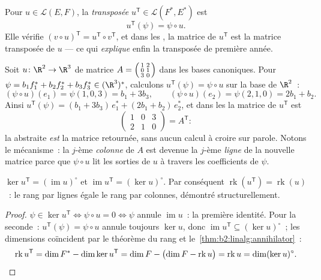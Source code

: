 \begin{definition}\label{def:b2:linalg:transpose}
Pour $u \in \mathcal{L}(E, F)$, la \emph{transposée} $u^{\mathsf T} \in \mathcal{L}(F^*, E^*)$ est
\[
u^{\mathsf T}(\psi) = \psi \circ u .
\]
Elle vérifie $(v \circ u)^{\mathsf T} = u^{\mathsf T} \circ v^{\mathsf
T}$, et dans les , la matrice de $u^{\mathsf T}$ est la
matrice transposée de $u$ --- ce qui \emph{explique} enfin la
transposée de première année.
\end{definition}

\begin{example}\label{ex:b2:linalg:transposework}
Soit $u \colon \R^2 \to \R^3$ de matrice $A =
\begin{psmallmatrix} 1 & 2\\ 0 & 1\\ 3 & 0\end{psmallmatrix}$ dans
les bases canoniques. Pour $\psi = b_1f_1^* + b_2f_2^* + b_3f_3^*
\in (\R^3)^*$, calculons $u^{\mathsf T}(\psi) = \psi \circ u$ sur
la base de $\R^2$~:
\[
(\psi \circ u)(e_1) = \psi(1, 0, 3) = b_1 + 3b_3,
\qquad
(\psi \circ u)(e_2) = \psi(2, 1, 0) = 2b_1 + b_2 .
\]
Ainsi $u^{\mathsf T}(\psi) = (b_1 + 3b_3)\,e_1^* + (2b_1 +
b_2)\,e_2^*$, et dans les  la matrice de $u^{\mathsf T}$
est
\[
\begin{pmatrix} 1 & 0 & 3\\ 2 & 1 & 0\end{pmatrix}
= A^{\mathsf T} :
\]
la  abstraite \emph{est} la matrice retournée, sans aucun
calcul à croire sur parole. Notons le mécanisme~: la
$j$-ème \emph{colonne} de $A$ est devenue la $j$-ème \emph{ligne} de la
nouvelle matrice parce que $\psi \circ u$ lit les sorties de $u$ à
travers les coefficients de $\psi$.
\end{example}

\begin{proposition}\label{prop:b2:linalg:transposerank}
$\ker u^{\mathsf T} = (\operatorname{im} u)^{\circ}$ et
$\operatorname{im} u^{\mathsf T} = (\ker u)^{\circ}$. Par conséquent
$\operatorname{rk}(u^{\mathsf T}) = \operatorname{rk}(u)$~: le rang par
lignes égale le rang par colonnes, démontré structurellement.
\end{proposition}

\begin{proof}
$\psi \in \ker u^{\mathsf T} \iff \psi \circ u = 0 \iff \psi$ annule
$\operatorname{im} u$~: la première identité. Pour la seconde~: $u^{\mathsf
T}(\psi) = \psi \circ u$ annule toujours $\ker u$, donc
$\operatorname{im} u^{\mathsf T} \subseteq (\ker u)^\circ$~;
les dimensions coïncident par le théorème du rang et
le~\cref{thm:b2:linalg:annihilator}~:
\[
\operatorname{rk} u^{\mathsf T} = \dim F^* - \dim\ker u^{\mathsf T}
= \dim F - \bigl(\dim F - \operatorname{rk} u\bigr)
= \operatorname{rk} u
= \dim (\ker u)^{\circ} . \qedhere
\]
\end{proof}

